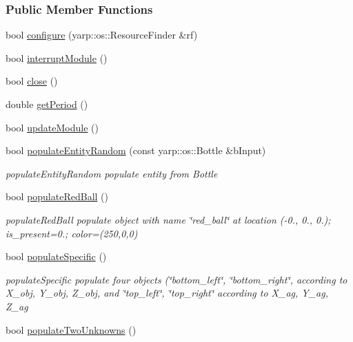 \subsubsection*{Public Member Functions}
\begin{DoxyCompactItemize}
\item 
bool \hyperlink{group__opcPopulator_a10c0ce4c8e20c9aa8f099fdb4ed15dcf}{configure} (yarp\+::os\+::\+Resource\+Finder \&rf)
\item 
bool \hyperlink{group__opcPopulator_a0bc208963071925c24e1c57a68f8881a}{interrupt\+Module} ()
\item 
bool \hyperlink{group__opcPopulator_a191a9f593be9cd6e877f1fd56804ba5b}{close} ()
\item 
double \hyperlink{group__opcPopulator_aeacfc987ebd30dd7c5fa23b586073fe8}{get\+Period} ()
\item 
bool \hyperlink{group__opcPopulator_a7b04ad1b8eadd3461062c611341d756d}{update\+Module} ()
\item 
bool \hyperlink{group__opcPopulator_a1b284864323f5a872cdcff286c3fd9f8}{populate\+Entity\+Random} (const yarp\+::os\+::\+Bottle \&b\+Input)
\begin{DoxyCompactList}\small\item\em populate\+Entity\+Random populate entity from Bottle \end{DoxyCompactList}\item 
bool \hyperlink{group__opcPopulator_ac93ef7767dd4ad2a9188c5a35372674a}{populate\+Red\+Ball} ()
\begin{DoxyCompactList}\small\item\em populate\+Red\+Ball populate object with name \char`\"{}red\+\_\+ball\char`\"{} at location (-\/0., 0., 0.); is\+\_\+present=0.; color=(250,0,0) \end{DoxyCompactList}\item 
bool \hyperlink{group__opcPopulator_a0fba845edd63a15da94b864022d20ba3}{populate\+Specific} ()
\begin{DoxyCompactList}\small\item\em populate\+Specific populate four objects (\char`\"{}bottom\+\_\+left\char`\"{}, \char`\"{}bottom\+\_\+right\char`\"{}, according to X\+\_\+obj, Y\+\_\+obj, Z\+\_\+obj, and \char`\"{}top\+\_\+left\char`\"{}, \char`\"{}top\+\_\+right\char`\"{} according to X\+\_\+ag, Y\+\_\+ag, Z\+\_\+ag \end{DoxyCompactList}\item 
bool \hyperlink{group__opcPopulator_a0f7311f7f70e2467ec283c7bae0a052c}{populate\+Two\+Unknowns} ()

\end{DoxyCompactItemize}
